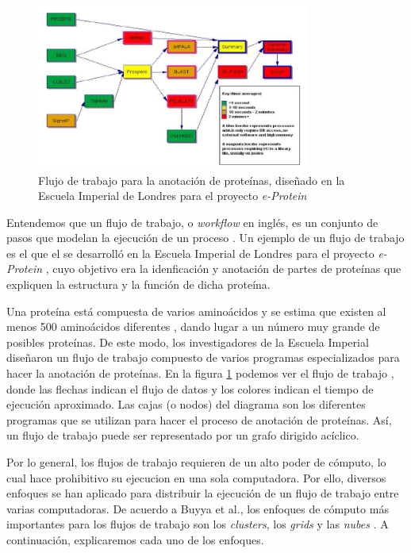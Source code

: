 \documentclass[letterpaper, 12pt]{report}
\begin{document}
\begin{figure}
    \begin{center}
        \includegraphics[width=0.8\textwidth]{imagenes/iceni-workflow}
    \end{center}
    \caption{Flujo de trabajo para la anotación de proteínas, diseñado en la Escuela Imperial de Londres para el proyecto \emph{e-Protein}}
    \label{fig:iceni-workflow}
\end{figure}

Entendemos que un flujo de trabajo, o \emph{workflow} en inglés, es un conjunto de pasos que modelan la ejecución de un proceso \cite{gutierrez2012agent}. Un ejemplo de un flujo de trabajo es el que el se desarrolló en la Escuela Imperial de Londres para el proyecto \emph{e-Protein} \cite{o2004mapping}, cuyo objetivo era la idenficación y anotación de partes de proteínas que expliquen la estructura y la función de dicha proteína.

Una proteína está compuesta de varios aminoácidos y se estima que existen al menos 500 aminoácidos diferentes \cite{wagner1983new}, dando lugar a un número muy grande de posibles proteínas. De este modo, los investigadores de la Escuela Imperial diseñaron un flujo de trabajo compuesto de varios programas especializados para hacer la anotación de proteínas. En la figura \ref{fig:iceni-workflow} podemos ver el flujo de trabajo \cite{o2004mapping}, donde las flechas indican el flujo de datos y los colores indican el tiempo de ejecución aproximado. Las cajas (o nodos) del diagrama son los diferentes programas que se utilizan para hacer el proceso de anotación de proteínas. Así, un flujo de trabajo puede ser representado por un grafo dirigido acíclico.

Por lo general, los flujos de trabajo requieren de un alto poder de cómputo, lo cual hace prohibitivo su ejecucion en una sola computadora. Por ello, diversos enfoques se han aplicado para distribuir la ejecución de un flujo de trabajo entre varias computadoras.  De acuerdo a Buyya et al., los enfoques de cómputo más importantes para los flujos de trabajo son los \emph{clusters}, los \emph{grids} y las \emph{nubes} \cite{buyya2009cloud}. A continuación, explicaremos cada uno de los enfoques.
\end{document}
